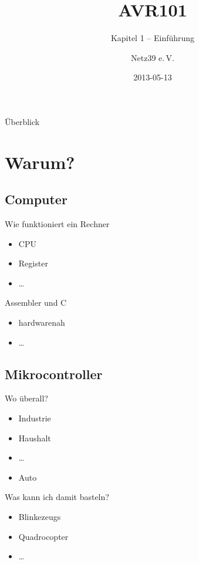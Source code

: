 \documentclass{beamer}
\title{AVR101}
\subtitle{Kapitel 1 -- Einführung}
\author{Netz39 e.\,V.}
\institute{\url{http://www.netz39.de/}}
\date{2013-05-13}
\begin{document}
\begin{frame}
	\titlepage
\end{frame}

\begin{frame}{Überblick}
    \tableofcontents
\end{frame}

\section{Warum?}

\subsection{Computer}

\begin{frame}{Wie funktioniert ein Rechner}
    \begin{itemize}
        \item CPU
        \item Register
        \item \dots
    \end{itemize}
\end{frame}

\begin{frame}{Assembler und C}
    \begin{itemize}
        \item hardwarenah
        \item \dots
    \end{itemize}
\end{frame}

\subsection{Mikrocontroller}

\begin{frame}{Wo überall?}
    \begin{itemize}
        \item Industrie
        \item Haushalt
        \item \dots
        \pause
        \item Auto
    \end{itemize}
\end{frame}

\begin{frame}{Was kann ich damit basteln?}
    \begin{itemize}
        \item Blinkezeugs
        \item Quadrocopter
        \item \dots
    \end{itemize}
\end{frame}
\end{document}
